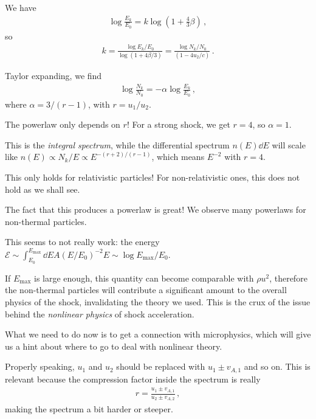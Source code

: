 \documentclass[main.tex]{subfiles}
\begin{document}
We have 
%
\begin{align}
\log \frac{E_k}{E_0 } = k \log \left(1 + \frac{4}{3} \beta \right)
\,,
\end{align}
%
so 
%
\begin{align}
k = \frac{\log E_k /E_0}{\log (1 + 4\beta /3)} = \frac{\log N_k / N_0 }{(1 - 4 u_2 / c)}
\,.
\end{align}

Taylor expanding, we find 
%
\begin{align}
\log \frac{N_k}{N_0 } = - \alpha \log \frac{E_k}{E_0}
\,,
\end{align}
%
where \(\alpha = 3 / (r-1)\), with \(r = u_1 / u_2 \). 

The powerlaw only depends on \(r\)! 
For a strong shock, we get \(r = 4\), so \(\alpha = 1\).

This is the \emph{integral spectrum}, while the differential spectrum \(n(E) \dd{E}\) will scale like \(n(E) \propto N_k / E \propto E^{- (r+2) / (r-1)}\), which means \(E^{-2}\) with \(r = 4\). 

This only holds for relativistic particles! 
For non-relativistic ones, this does not hold as we shall see.
 
The fact that this produces a powerlaw is great! We observe many powerlaws for non-thermal particles.

This seems to not really work: the energy \(\mathcal{E} \sim \int_{E_0 }^{E _{\text{max}}} \dd{E} A (E/E_0)^{-2} E \sim \log E _{\text{max}} / E_0 \).

If \(E _{\text{max}}\) is large enough, this quantity can become comparable with \(\rho u^2\), therefore the non-thermal particles will contribute a significant amount to the overall physics of the shock, invalidating the theory we used. 
This is the crux of the issue behind the \emph{nonlinear physics} of shock acceleration. 

What we need to do now is to get a connection with microphysics, which will give us a hint about where to go to deal with nonlinear theory. 

Properly speaking, \(u_1 \) and \(u_2 \) should be replaced with \(u_1 \pm v_{A, 1}\) and so on. 
This is relevant because the compression factor inside the spectrum is really 
%
\begin{align}
r = \frac{u_1 \pm v_{A, 1}}{u_2 \pm v_{A, 2}}
\,,
\end{align}
%
making the spectrum a bit harder or steeper. 
\end{document}
